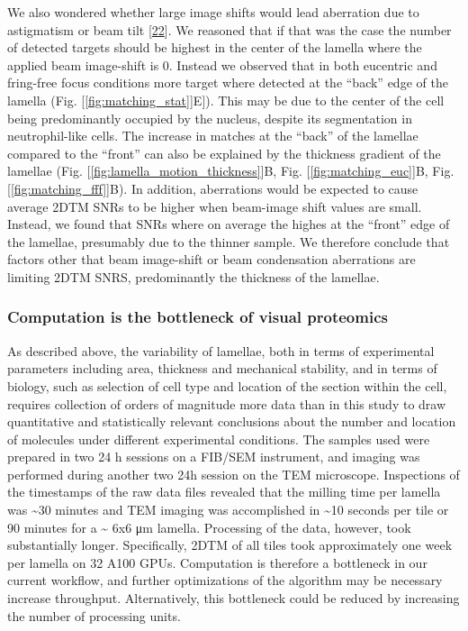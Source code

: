 \documentclass[
]{article}
\begin{document}
We also wondered whether large image shifts would lead aberration due to
astigmatism or beam tilt {[}\protect\hyperlink{ref-APSL9LmU}{22}{]}. We reasoned that if
that was the case the number of detected targets should be highest in the center of the
lamella where the applied beam image-shift is 0. Instead we observed that in
both eucentric and fring-free focus conditions more target where detected at the
``back'' edge of the lamella (Fig. {[}\ref{fig:matching_stat}{]}E{]}). This may be due to the center of the cell being predominantly
occupied by the nucleus, despite its segmentation in neutrophil-like cells. The
increase in matches at the ``back'' of the lamellae compared to the ``front'' can also
be explained by the thickness gradient of the lamellae (Fig. {[}\ref{fig:lamella_motion_thickness}{]}B,
Fig. {[}\ref{fig:matching_euc}{]}B, Fig. {[}\ref{fig:matching_fff}{]}B). In addition, aberrations would be expected to cause average 2DTM SNRs to be higher when beam-image shift
values are small. Instead, we found that SNRs where on average the highes at the
``front'' edge of the lamellae, presumably due to the thinner sample. We therefore
conclude that factors other that beam image-shift or beam
condensation aberrations are limiting 2DTM SNRS, predominantly the thickness of
the lamellae.

\hypertarget{computation-is-the-bottleneck-of-visual-proteomics}{%
\subsubsection{Computation is the bottleneck of visual proteomics}\label{computation-is-the-bottleneck-of-visual-proteomics}}

As described above, the variability of lamellae, both in terms of experimental
parameters including area, thickness and mechanical stability, and in terms of
biology, such as selection of cell type and location of the section within the
cell, requires collection of orders of magnitude more data than in this study to draw quantitative
and statistically relevant conclusions about the number and location of
molecules under different experimental conditions. The samples used were
prepared in two 24 h sessions on a FIB/SEM instrument, and imaging was performed
during another two 24h session on the TEM microscope. Inspections of the
timestamps of the raw data files revealed that the milling time per lamella was
\textasciitilde30 minutes and TEM imaging was accomplished in \textasciitilde10 seconds per tile or 90
minutes for a \textasciitilde{} 6x6 μm lamella. Processing of the data, however, took
substantially longer. Specifically, 2DTM of all tiles took approximately one
week per lamella on 32 A100 GPUs. Computation is therefore a bottleneck in our
current workflow, and further optimizations of the algorithm may be necessary
increase throughput. Alternatively, this bottleneck could be reduced by
increasing the number of processing units.
\end{document}
